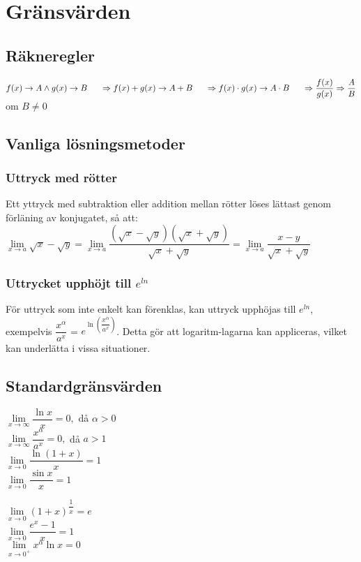 \documentclass{article}
\begin{document}
\section{Gränsvärden}
\subsection{Räkneregler}
\begin{doublespace}
$f(x) \rightarrow A \wedge g(x) \rightarrow B\\
\indent \Rightarrow f(x) + g(x) \rightarrow A + B\\
\indent \Rightarrow f(x)\cdot g(x) \rightarrow A\cdot B\\
\indent \Rightarrow \dfrac{f(x)}{g(x)} \Rightarrow \dfrac{A}{B}$ om $B\ne 0$\\
\subsection{Vanliga lösningsmetoder}
\subsubsection{Uttryck med rötter}
Ett yttryck med subtraktion eller addition mellan rötter löses lättast genom förläning av konjugatet, så att:\\
$\lim\limits_{x\rightarrow a} \sqrt{x} - \sqrt{y} = \lim\limits_{x\rightarrow a} \dfrac{(\sqrt{x} - \sqrt{y})(\sqrt{x} + \sqrt{y})}{\sqrt{x} + \sqrt{y}} = \lim\limits_{x\rightarrow a} \dfrac{x - y}{\sqrt{x} + \sqrt{y}}$
\subsubsection{Uttrycket upphöjt till $e^{ln}$}
För uttryck som inte enkelt kan förenklas, kan uttryck upphöjas till $e^{ln}$, exempelvis $\dfrac{x^{\alpha}}{a^{x}}$ = $e^{\ln({\dfrac{x^{\alpha}}{a^{x}}})}$. Detta gör att logaritm-lagarna kan appliceras, vilket kan underlätta i vissa situationer.\\
\subsection{Standardgränsvärden}
\begin{minipage}[t]{0.5\textwidth}
$\lim\limits_{x\rightarrow \infty}\dfrac{\ln{x}}{x} = 0,$ då $ \alpha > 0$\\
$\lim\limits_{x\rightarrow \infty}\dfrac{x^{\alpha}}{a^{x}} = 0, $ då $ a > 1$\\
$\lim\limits_{x\rightarrow 0}\dfrac{\ln{(1+x)}}{x} = 1$\\
$\lim\limits_{x\rightarrow 0}\dfrac{\sin x}{x} = 1$\\
\end{minipage}
\begin{minipage}[t]{0.5\textwidth}
$\lim\limits_{x\rightarrow 0} (1+x)^{\dfrac{1}{x}} = e$\\
$\lim\limits_{x\rightarrow 0} \dfrac{e^{x}- 1}{x} = 1$\\
$\lim\limits_{x\rightarrow 0^{+}} x^{\alpha}\ln{x} = 0$\\
\end{minipage}
\end{doublespace}
\end{document}
